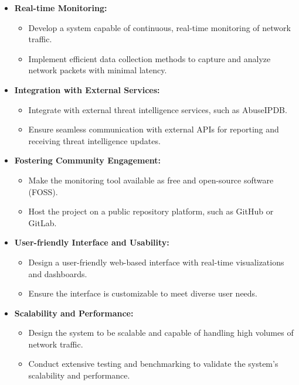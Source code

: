 \documentclass{article}
\begin{document}
    \begin{itemize}
        \item \textbf{Real-time Monitoring:}
        \begin{itemize}
            \item Develop a system capable of continuous, real-time monitoring of network traffic.
            \item Implement efficient data collection methods to capture and analyze network packets with minimal latency.
        \end{itemize}

        \item \textbf{Integration with External Services:}
        \begin{itemize}
            \item Integrate with external threat intelligence services, such as AbuseIPDB\@.
            \item Ensure seamless communication with external APIs for reporting and receiving threat intelligence updates.
        \end{itemize}


        \item \textbf{Fostering Community Engagement:}
        \begin{itemize}
            \item Make the monitoring tool available as free and open-source software (FOSS).
            \item Host the project on a public repository platform, such as GitHub or GitLab.
        \end{itemize}

        \item \textbf{User-friendly Interface and Usability:}
        \begin{itemize}
            \item Design a user-friendly web-based interface with real-time visualizations and dashboards.
            \item Ensure the interface is customizable to meet diverse user needs.
        \end{itemize}

        \item \textbf{Scalability and Performance:}
        \begin{itemize}
            \item Design the system to be scalable and capable of handling high volumes of network traffic.
            \item Conduct extensive testing and benchmarking to validate the system's scalability and performance.
        \end{itemize}


\end{itemize}
\end{document}

